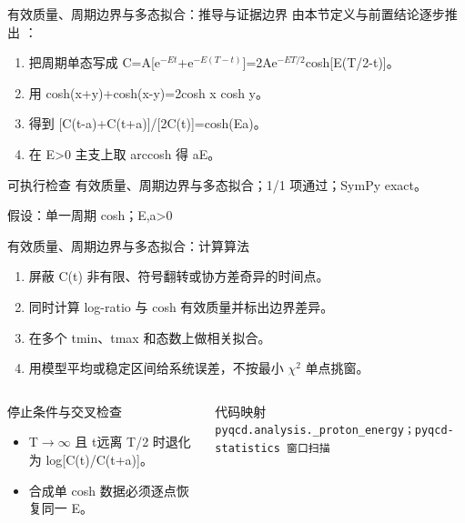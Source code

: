 \begin{frame}[t]{有效质量、周期边界与多态拟合：推导与证据边界}
\footnotesize
{}\quad 由本节定义与前置结论逐步推出 ：
\begin{enumerate}
\item 把周期单态写成 C=A[e\ensuremath{^{-Et}}+e\ensuremath{^{-E(T-t)}}]=2Ae\ensuremath{^{-ET/2}}cosh[E(T/\allowbreak{}2-t)]。
\item 用 cosh(x+y)+cosh(x-y)=2cosh x cosh y。
\item 得到 [C(t-a)+C(t+a)]/\allowbreak{}[2C(t)]=cosh(Ea)。
\item 在 E>0 主支上取 arccosh 得 aE。
\end{enumerate}\begin{block}{可执行检查}
\quad 有效质量、周期边界与多态拟合；1/1 项通过；SymPy exact。
\par\scriptsize 假设：单一周期 cosh；E,a>0
\end{block}
\end{frame}

\begin{frame}[t]{有效质量、周期边界与多态拟合：计算算法}
\footnotesize
{}\begin{enumerate}
\item 屏蔽 C(t) 非有限、符号翻转或协方差奇异的时间点。
\item 同时计算 log-ratio 与 cosh 有效质量并标出边界差异。
\item 在多个 tmin、tmax 和态数上做相关拟合。
\item 用模型平均或稳定区间给系统误差，不按最小 \ensuremath{\chi}\ensuremath{^{2}} 单点挑窗。
\end{enumerate}\begin{columns}[T,onlytextwidth]
\begin{block}{停止条件与交叉检查}\scriptsize\begin{itemize}
\item[\CheckMark] T\ensuremath{\rightarrow}\ensuremath{\infty} 且 t远离 T/\allowbreak{}2 时退化为 log[C(t)/\allowbreak{}C(t+a)]。
\item[\CheckMark] 合成单 cosh 数据必须逐点恢复同一 E。
\end{itemize}\end{block}
\begin{block}{代码映射}
\scriptsize \texttt{pyqcd.\allowbreak{}analysis.\allowbreak{}\_\allowbreak{}proton\_\allowbreak{}energy；pyqcd-statistics 窗口扫描}
\end{block}\end{columns}\end{frame}

